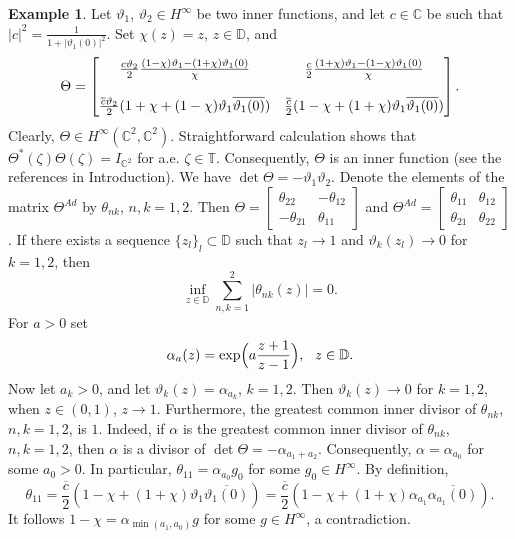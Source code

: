 \documentclass[a4paper,oneside,11pt]{amsart}
\numberwithin{equation}{section}
\theoremstyle{plain}
\theoremstyle{definition}
\newtheorem{example}[theorem]{Example}
\begin{document}
\begin{example} \label{exaunicellular} Let $\vartheta_1$, $\vartheta_2\in H^\infty$ be two inner functions, and let $c\in\mathbb C$ be such that 
$|c|^2=\frac{1}{1+|\vartheta_1(0)|^2}$. Set  $\chi(z)=z$, $z\in\mathbb D$, and 
\begin{equation}\label{exaexp}
\Theta=\left[\begin{matrix} \frac{c\vartheta_2}{2}\frac{(1-\chi)\vartheta_1-(1+\chi)\vartheta_1(0)}{\chi} & 
\frac{c}{2}\frac{(1+\chi)\vartheta_1-(1-\chi)\vartheta_1(0)}{\chi} \\ \empty &\empty \\
\frac{\overline c\vartheta_2}{2}(1+\chi +(1-\chi)\vartheta_1\overline{\vartheta_1(0)}) & 
\frac{\overline c}{2}(1-\chi+(1+\chi)\vartheta_1\overline{\vartheta_1(0)})\end{matrix}\right].
\end{equation}
Clearly,  $\Theta\in H^\infty(\mathbb C^2,\mathbb C^2)$. 
Straightforward calculation shows that $\Theta^*(\zeta)\Theta(\zeta)=I_{\mathbb C^2}$ for a.e. $\zeta\in \mathbb T$. Consequently, 
$\Theta$ is an inner function (see the references in Introduction). We have $\det \Theta=-\vartheta_1\vartheta_2$. 
Denote the elements of the matrix $\Theta^{Ad}$ by $\theta_{nk}$, $n,k=1,2$. 
Then  $\Theta=\left[\begin{matrix}\theta_{22} & -\theta_{12}\\ -\theta_{21} & \theta_{11}\end{matrix}\right]$ and 
$\Theta^{Ad}=\left[\begin{matrix}\theta_{11} & \theta_{12}\\ \theta_{21} & \theta_{22}\end{matrix}\right]$. 
If there exists a sequence $\{z_l\}_l\subset\mathbb D$
 such that $z_l\to 1$ and  $\vartheta_k(z_l)\to 0$ for $k=1,2$, then 
\begin{equation*} \inf_{z\in\mathbb D}\sum_{n,k=1}^2|\theta_{nk}(z)|=0.  
\end{equation*}
For $a>0$ set 
\begin{equation}\label{defexp}\alpha_a(z)=\exp\Bigl(a\frac{z+1}{z-1}\Bigr), \ \  z\in\mathbb D. 
\end{equation} 
Now let $a_k>0$,  and let $\vartheta_k(z)=\alpha_{a_k}$, $k=1,2$. Then $\vartheta_k(z)\to 0$ for $k=1,2$,
when $z\in(0,1)$, $z\to 1$. 
Furthermore, 
the greatest common inner divisor of  $\theta_{nk}$, $n,k=1,2$, is $1$. Indeed, if $\alpha$ is  
the greatest common inner divisor of  $\theta_{nk}$, $n,k=1,2$, then $\alpha$ is a divisor of 
$\det\Theta=-\alpha_{a_1+a_2}$. Consequently,  $\alpha=\alpha_{a_0}$ for some $a_0>0$. 
In particular, $\theta_{11}=\alpha_{a_0}g_0$ for some $g_0\in H^\infty$. 
By definition, \begin{equation*} \theta_{11} =
\frac{\overline c}{2}(1-\chi+(1+\chi)\vartheta_1\overline{\vartheta_1(0)})=
\frac{\overline c}{2}(1-\chi+(1+\chi)\alpha_{a_1}\overline{\alpha_{a_1}(0)}).
\end{equation*}
It follows   $1-\chi=\alpha_{\min(a_1,a_0)}g$ for some $g\in H^\infty$, a contradiction. 


\end{example}
\end{document}
